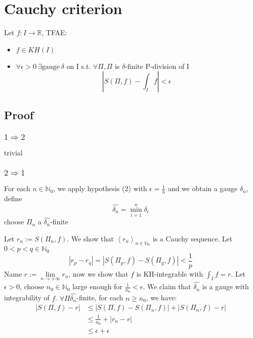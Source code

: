 \documentclass{book}
\newcommand{\abs}[1]{\left\lvert #1 \right\rvert}
\begin{document}
\section{Cauchy criterion}
Let $f:I\rightarrow \mathbb R$, TFAE:
\begin{itemize}
    \item $f\in KH(I)$
    \item $\forall \epsilon>0\ \exists \text{gauge}\ \delta$ on I s.t. $\forall \Pi, \Pi$ is $\delta$-finite P-division of I
    $$\abs{S(\Pi,f)-\int_If}<\epsilon$$
\end{itemize}
\subsection*{Proof}
\subsubsection{$1\Rightarrow2$}
trivial
\subsubsection{$2\Rightarrow1$}
For each $n\in \mathbb N_0$, we apply hypothesis (2) with $\epsilon=\frac{1}n$ and we obtain a gauge $\delta_n$, define
$$\hat{\delta_n}=\min\limits_{i=1}^n\delta_i$$
choose $\Pi_n$ a  $\hat{\delta_n}$-finite

Let $r_n:=S(\Pi_n,f)$. We show that $\left<r_n\right>_{n\in \mathbb N_0}$ is a Cauchy sequence. Let $0<p<q\in \mathbb N_0$
$$\abs{r_p-r_q}=\abs{S(\Pi_p,f)-S(\Pi_q,f)}<\frac{1}p$$
Name $r:=\lim\limits_{n\rightarrow +\infty}r_n$, now we show that $f$ is KH-integrable with $\int_If=r$. Let $\epsilon>0$, choose $n_0\in \mathbb N_0$ large enough for $\frac{1}{n_0}<\epsilon$. We claim that $\hat{\delta_n}$ is a gauge with integrability of $f$. $\forall \Pi\hat{\delta_n}$-finite, for each $n\geq n_0$, we have:
$$\begin{aligned}
    \abs{S(\Pi,f)-r}&\leq\abs{S(\Pi,f)-S(\Pi_n,f)}+\abs{S(\Pi_n,f)-r}\\
    &\leq\frac{1}{n_0}+\abs{r_n-r}\\
    &\leq \epsilon+\epsilon
\end{aligned}$$
\end{document}
